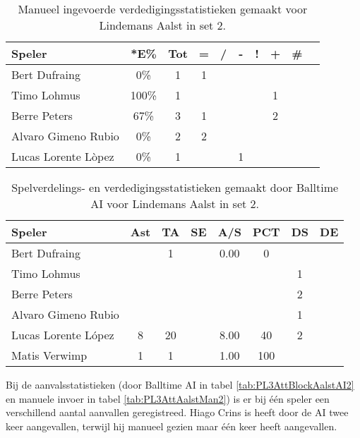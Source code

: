 \begin{table}[ht!]
    \centering
    \scriptsize
    \begin{tabular}{|l|c|c|c|c|c|c|c|c|c|}
        \hline
        \textbf{Speler} & *E\% & Tot & = & / & - & ! & + & \# \\ \hline
        Bert Dufraing & 0\% & 1 & 1 &  &  &  &  & \\ 
        Timo Lohmus & 100\% & 1 &  &  &  &  & 1 & \\ 
        Berre Peters & 67\% & 3 & 1 &  &  &  & 2 & \\ 
        Alvaro Gimeno Rubio & 0\% & 2 & 2 &  &  &  &  & \\ 
        Lucas Lorente Lòpez & 0\% & 1 &  &  & 1 &  &  & \\ \hline
    \end{tabular}
    \caption[Manueel ingevoerde verdedigingsstatistieken gemaakt voor Lindemans Aalst in set 2]{\label{tab:PL3DigAalstMan2}Manueel ingevoerde verdedigingsstatistieken gemaakt voor Lindemans Aalst in set 2.}
\end{table}

\begin{table}[ht!]
  \centering
  \scriptsize
  \begin{tabular}{|l|c|c|c|c|c|c|c|} \hline
    \textbf{Speler} & Ast & TA & SE & A/S & PCT & DS & DE \\ \hline
    Bert Dufraing &  & 1 &  & 0.00 & 0 &  &  \\
    Timo Lohmus &   &   &   &   &   & 1  &   \\
    Berre Peters &   &   &   &   &   &  2 &   \\
    Alvaro Gimeno Rubio &  &  &  &  &   & 1 &   \\
    Lucas Lorente López & 8 & 20 &  & 8.00 & 40 & 2 &  \\
    Matis Verwimp & 1 & 1 &  & 1.00 & 100 &   &   \\ \hline
  \end{tabular}
  \caption[Spelverdelings- en verdedigingsstatistieken gemaakt door Balltime AI voor Lindemans Aalst in set 2]{\label{tab:PL3SetDigAalstAI2}Spelverdelings- en verdedigingsstatistieken gemaakt door Balltime AI voor Lindemans Aalst in set 2.}
\end{table}

Bij de aanvalsstatistieken (door Balltime AI in tabel \ref{tab:PL3AttBlockAalstAI2} en manuele invoer in tabel \ref{tab:PL3AttAalstMan2}) is er bij één speler een verschillend aantal aanvallen geregistreed. Hiago Crins is heeft door de AI twee keer aangevallen, terwijl hij manueel gezien maar één keer heeft aangevallen.

